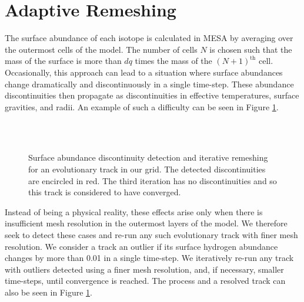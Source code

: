 \documentclass[manuscript]{aastex}
\begin{document}
\section{Adaptive Remeshing}
\label{sec:remeshing}

The surface abundance of each isotope is calculated in MESA by averaging over the outermost cells of the model. The number of cells $N$ is chosen such that the mass of the surface is more than $dq$ times the mass of the $(N+1)^{\text{th}}$ cell. Occasionally, this approach can lead to a situation where surface abundances change dramatically and discontinuously in a single time-step. These abundance discontinuities then propagate as discontinuities in effective temperatures, surface gravities, and radii. An example of such a difficulty can be seen in Figure \ref{fig:discontinuity}. 

\begin{figure}
    \centering
    \\
    \\
    \caption{Surface abundance discontinuity detection and iterative remeshing for an evolutionary track in our grid. The detected discontinuities are encircled in red. The third iteration has no discontinuities and so this track is considered to have converged. }
    \label{fig:discontinuity}
\end{figure}

Instead of being a physical reality, these effects arise only when there is insufficient mesh resolution in the outermost layers of the model. We therefore seek to detect these cases and re-run any such evolutionary track with finer mesh resolution. We consider a track an outlier if its surface hydrogen abundance changes by more than 0.01 in a single time-step. We iteratively re-run any track with outliers detected using a finer mesh resolution, and, if necessary, smaller time-steps, until convergence is reached. The process and a resolved track can also be seen in Figure \ref{fig:discontinuity}. 

\end{document}
